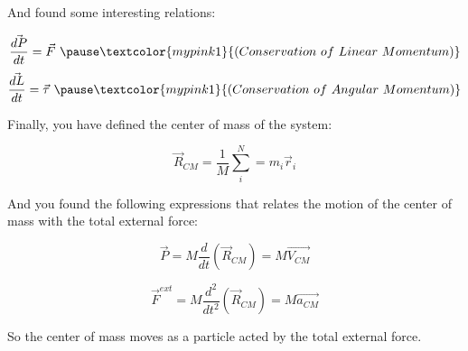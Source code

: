 \documentclass[]{beamer}
\begin{document}
  \begin{frame}

    And found some interesting relations:
     
     \pause
     
     \begin{equation}
       \frac{\vec{dP}}{dt}=\vec{F}~\pause \textcolor{mypink1}{(Conservation~of~Linear~Momentum)}
     \end{equation}
     \pause
     \begin{equation}
       \frac{\vec{dL}}{dt}=\vec{\tau}~\pause \textcolor{mypink1}{(Conservation~of~Angular~Momentum)}
     \end{equation}
 
     
\end{frame}

      
\begin{frame}

  Finally, you have defined the center of mass of the system:
  \pause

  \begin{equation}
    \vec{R}_{CM}=\frac{1}{M}\sum^N_i=m_i\vec{r}_i
  \end{equation}

    \pause

  And you found the following expressions that relates the motion of the center of mass with the total external force:
  
  
  \begin{equation}
    \vec{P}=M\frac{d}{dt}(\vec{R}_{CM})=M\vec{V_{CM}}
  \end{equation}
  
   
  \begin{equation}
    \vec{F}^{ext}=M\frac{d^2}{dt^2}(\vec{R}_{CM})=M\vec{a_{CM}}
  \end{equation}

  \pause 
\vspace{3mm}

  So the center of mass moves as a particle acted by the total external force.

\end{frame}
\end{document}
